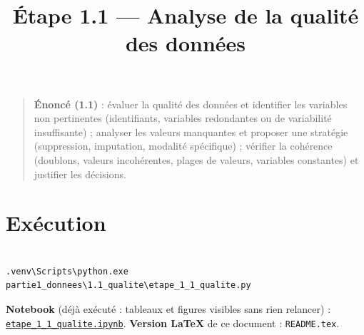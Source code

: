 \documentclass[

  french,

  10pt,

  a4paper,

]{article}
\title{Étape 1.1 --- Analyse de la qualité des données}
\author{}
\date{}
\begin{document}
\maketitle



{

\hypersetup{linkcolor=black}

\setcounter{tocdepth}{3}

\tableofcontents

}

\begin{quote}

\textbf{Énoncé (1.1)} : évaluer la qualité des données et identifier les variables non pertinentes (identifiants, variables redondantes ou de variabilité insuffisante) ; analyser les valeurs manquantes et proposer une stratégie (suppression, imputation, modalité spécifique) ; vérifier la cohérence (doublons, valeurs incohérentes, plages de valeurs, variables constantes) et justifier les décisions.

\end{quote}



\section{Exécution}



\begin{verbatim}

.venv\Scripts\python.exe partie1_donnees\1.1_qualite\etape_1_1_qualite.py

\end{verbatim}



\textbf{Notebook} (déjà exécuté : tableaux et figures visibles sans rien relancer) : \href{etape_1_1_qualite.ipynb}{\texttt{etape\_1\_1\_qualite.ipynb}}. \textbf{Version LaTeX} de ce document : \texttt{README.tex}.
\end{document}
